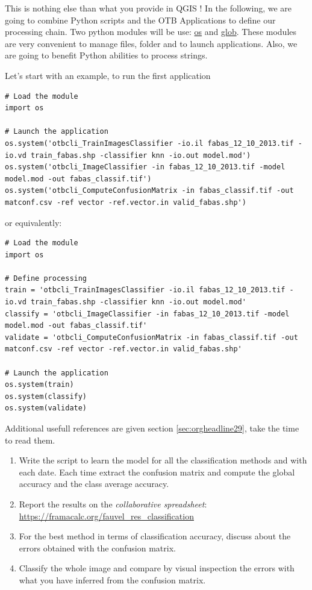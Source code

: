 \documentclass[a4paper,11pt,DIV=18]{scrartcl}
\begin{document}
This is nothing else than what you provide in QGIS ! In the following,
we are  going to combine  Python scripts  and the OTB  Applications to
define our  processing chain. Two python  modules will be use:  \href{https://docs.python.org/2/library/os.html}{os} and
\href{https://docs.python.org/2/library/glob.html}{glob}.  These modules  are very convenient to manage  files, folder and
to launch applications. Also, we are going to benefit Python abilities
to process strings.

Let's start with an example, to run the first application

\begin{verbatim}
# Load the module
import os

# Launch the application
os.system('otbcli_TrainImagesClassifier -io.il fabas_12_10_2013.tif -io.vd train_fabas.shp -classifier knn -io.out model.mod')
os.system('otbcli_ImageClassifier -in fabas_12_10_2013.tif -model model.mod -out fabas_classif.tif')
os.system('otbcli_ComputeConfusionMatrix -in fabas_classif.tif -out matconf.csv -ref vector -ref.vector.in valid_fabas.shp')
\end{verbatim}

or equivalently:

\begin{verbatim}
# Load the module
import os

# Define processing
train = 'otbcli_TrainImagesClassifier -io.il fabas_12_10_2013.tif -io.vd train_fabas.shp -classifier knn -io.out model.mod' 
classify = 'otbcli_ImageClassifier -in fabas_12_10_2013.tif -model model.mod -out fabas_classif.tif'
validate = 'otbcli_ComputeConfusionMatrix -in fabas_classif.tif -out matconf.csv -ref vector -ref.vector.in valid_fabas.shp'

# Launch the application
os.system(train)
os.system(classify)
os.system(validate)
\end{verbatim}

Additional usefull references are  given section \ref{sec:orgheadline29}, take the
time to read them.

\begin{work}
\begin{enumerate}
\item Write  the script  to learn  the model  for all  the classification
methods and with each date.  Each time extract the confusion matrix
and compute the global accuracy and the class average accuracy.
\item Report the results on the \emph{collaborative spreadsheet}: \url{https://framacalc.org/fauvel_res_classification}
\item For  the best method  in terms of classification  accuracy, discuss
about the errors obtained with the confusion matrix.
\item Classify the  whole image  and  compare by  visual inspection  the
errors with what you have inferred from the confusion matrix.
\end{enumerate}
\end{work}
\end{document}
